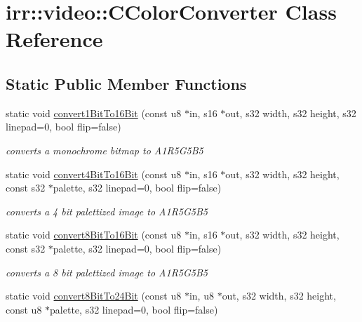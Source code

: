 \hypertarget{classirr_1_1video_1_1_c_color_converter}{\section{irr\-:\-:video\-:\-:C\-Color\-Converter Class Reference}
\label{classirr_1_1video_1_1_c_color_converter}
}
\subsection*{Static Public Member Functions}
\begin{DoxyCompactItemize}
\item 
static void \hyperlink{classirr_1_1video_1_1_c_color_converter_a15ce8ced41c985f8a98d739e962926f3}{convert1\-Bit\-To16\-Bit} (const u8 $\ast$in, s16 $\ast$out, s32 width, s32 height, s32 linepad=0, bool flip=false)
\begin{DoxyCompactList}\small\item\em converts a monochrome bitmap to A1\-R5\-G5\-B5 \end{DoxyCompactList}\item 
\hypertarget{classirr_1_1video_1_1_c_color_converter_aefa750a97769f98979320d1b1095b468}{static void \hyperlink{classirr_1_1video_1_1_c_color_converter_aefa750a97769f98979320d1b1095b468}{convert4\-Bit\-To16\-Bit} (const u8 $\ast$in, s16 $\ast$out, s32 width, s32 height, const s32 $\ast$palette, s32 linepad=0, bool flip=false)}\label{classirr_1_1video_1_1_c_color_converter_aefa750a97769f98979320d1b1095b468}

\begin{DoxyCompactList}\small\item\em converts a 4 bit palettized image to A1\-R5\-G5\-B5 \end{DoxyCompactList}\item 
static void \hyperlink{classirr_1_1video_1_1_c_color_converter_aedd5f6662bbd580c16bf6667587e3a92}{convert8\-Bit\-To16\-Bit} (const u8 $\ast$in, s16 $\ast$out, s32 width, s32 height, const s32 $\ast$palette, s32 linepad=0, bool flip=false)
\begin{DoxyCompactList}\small\item\em converts a 8 bit palettized image to A1\-R5\-G5\-B5 \end{DoxyCompactList}\item 
\hypertarget{classirr_1_1video_1_1_c_color_converter_a6f6e3ab6ed50984965a19810c7ff571f}{static void \hyperlink{classirr_1_1video_1_1_c_color_converter_a6f6e3ab6ed50984965a19810c7ff571f}{convert8\-Bit\-To24\-Bit} (const u8 $\ast$in, u8 $\ast$out, s32 width, s32 height, const u8 $\ast$palette, s32 linepad=0, bool flip=false)}\label{classirr_1_1video_1_1_c_color_converter_a6f6e3ab6ed50984965a19810c7ff571f}


\end{DoxyCompactItemize}
